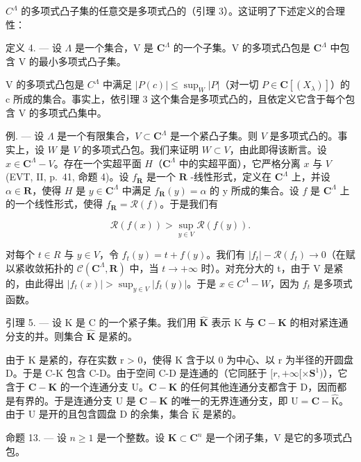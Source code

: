 \(C^{\Lambda}\) 的多项式凸子集的任意交是多项式凸的（引理 3）。这证明了下述定义的合理性：

定义 4. --- 设 \(\Lambda\) 是一个集合，V 是 \(\mathbf{C}^{\Lambda}\) 的一个子集。V 的多项式凸包是 \(\mathbf{C}^{\Lambda}\) 中包含 V 的最小多项式凸子集。

V 的多项式凸包是 \(C^{\Lambda}\) 中满足 \(|P(c)| \leqslant \sup_{W} |P|\)（对一切 \(P \in \mathbf{C}[(X_{\lambda})]\)）的 c 所成的集合。事实上，依引理 3 这个集合是多项式凸的，且依定义它含于每个包含 V 的多项式凸集中。

例. --- 设 \(\Lambda\) 是一个有限集合，\(V \subset \mathbf{C}^{\Lambda}\) 是一个紧凸子集。则 \(V\) 是多项式凸的。事实上，设 \(W\) 是 \(V\) 的多项式凸包。我们来证明 \(W \subset V\)，由此即得该断言。设 \(x \in \mathbf{C}^{\Lambda} - V\)。存在一个实超平面 \(H\)（\(\mathbf{C}^{\Lambda}\) 中的实超平面），它严格分离 \(x\) 与 \(V\) (EVT, II, p.~41, 命题 4)。设 \(f_{\mathbf{R}}\) 是一个 \(\mathbf{R}\) -线性形式，定义在 \(\mathbf{C}^{\Lambda}\) 上，并设 \(\alpha \in \mathbf{R}\)，使得 \(H\) 是 \(y \in \mathbf{C}^{\Lambda}\) 中满足 \(f_{\mathbf{R}}(y) = \alpha\) 的 y 所成的集合。设 \(f\) 是 \(\mathbf{C}^{\Lambda}\) 上的一个线性形式，使得 \(f_{\mathbf{R}} = \mathcal{R}(f)\)。于是我们有

\[
\mathcal {R} (f (x)) > \sup _ {y \in V} \mathcal {R} (f (y)).
\]

对每个 \(t \in R\) 与 \(y \in V\)，令 \(f_{t}(y) = t + f(y)\)。我们有 \(|f_{t}| - \mathcal{R}(f_{t}) \to 0\)（在赋以紧收敛拓扑的 \(\mathcal{C}(\mathbf{C}^{\Lambda}, \mathbf{R})\) 中，当 \(t \to +\infty\) 时）。对充分大的 t，由于 V 是紧的，由此得出 \(|f_{t}(x)| > \sup_{y \in V} |f_{t}(y)|\)。于是 \(x \in C^{\Lambda} - W\)，因为 \(f_{t}\) 是多项式函数。

引理 5. --- 设 K 是 C 的一个紧子集。我们用 \(\widehat{\mathbf{K}}\) 表示 K 与 \(\mathbf{C} - \mathbf{K}\) 的相对紧连通分支的并。则集合 \(\widehat{\mathbf{K}}\) 是紧的。

由于 K 是紧的，存在实数 r > 0，使得 K 含于以 0 为中心、以 r 为半径的开圆盘 D。于是 C-K 包含 C-D。由于空间 C-D 是连通的（它同胚于 \([r, +\infty[\times\mathbf{S}^1)\)），它含于 \(\mathbf{C}-\mathbf{K}\) 的一个连通分支 U。\(\mathbf{C}-\mathbf{K}\) 的任何其他连通分支都含于 D，因而都是有界的。于是连通分支 U 是 \(\mathbf{C}-\mathbf{K}\) 的唯一的无界连通分支，即 \(\mathrm{U} = \mathbf{C}-\widehat{\mathrm{K}}\)。由于 U 是开的且包含圆盘 D 的余集，集合 \(\widehat{\mathrm{K}}\) 是紧的。

命题 13. --- 设 \(n \geqslant 1\) 是一个整数。设 \(\mathbf{K} \subset \mathbf{C}^{n}\) 是一个闭子集，V 是它的多项式凸包。

